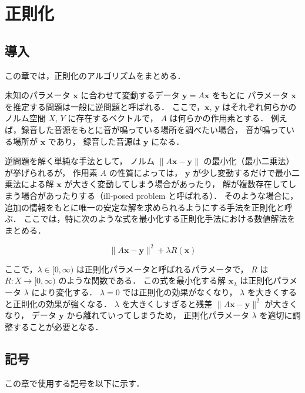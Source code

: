 %

\part{正則化}

\chapter{導入}

この章では，正則化のアルゴリズムをまとめる．

未知のパラメータ $\bm{x}$ に合わせて変動するデータ $\bm{y} = A \bm{x}$ をもとに
パラメータ $\bm{x}$ を推定する問題は一般に逆問題と呼ばれる．
ここで，$\bm{x}$, $\bm{y}$ はそれぞれ何らかのノルム空間 $X$, $Y$ に存在するベクトルで，
$A$ は何らかの作用素とする．
例えば，録音した音源をもとに音が鳴っている場所を調べたい場合，
音が鳴っている場所が $\bm{x}$ であり，
録音した音源は $\bm{y}$ になる．

逆問題を解く単純な手法として，
ノルム $\|A \bm{x} - \bm{y}\|$ の最小化（最小二乗法）が挙げられるが，
作用素 $A$ の性質によっては，
$\bm{y}$ が少し変動するだけで最小二乗法による解 $\bm{x}$ が大きく変動してしまう場合があったり，
解が複数存在してしまう場合があったりする（ill-posed problem と呼ばれる）．
そのような場合に，追加の情報をもとに唯一の安定な解を求められるようにする手法を正則化と呼ぶ．
ここでは，特に次のような式を最小化する正則化手法における数値解法をまとめる．

\begin{equation}
    \|A \bm{x} - \bm{y}\|^2 + \lambda R(\bm{x})
\end{equation}

ここで，$\lambda \in [0, \infty)$ は正則化パラメータと呼ばれるパラメータで，
$R$ は $R : X \to [0, \infty)$ のような関数である．
この式を最小化する解 $\bm{x}_{\lambda}$ は正則化パラメータ $\lambda$ により変化する．
$\lambda = 0$ では正則化の効果がなくなり，
$\lambda$ を大きくすると正則化の効果が強くなる．
$\lambda$ を大きくしすぎると残差 $\|A \bm{x} - \bm{y}\|^2$ が大きくなり，
データ $\bm{y}$ から離れていってしまうため，
正則化パラメータ $\lambda$ を適切に調整することが必要となる．

\chapter{記号}

この章で使用する記号を以下に示す．


